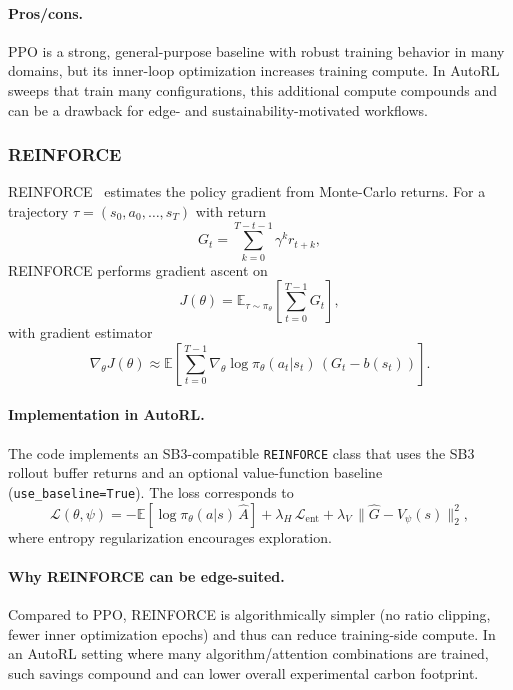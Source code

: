 \documentclass[11pt]{article}
\begin{document}
\paragraph{Pros/cons.}
PPO is a strong, general-purpose baseline with robust training behavior in many domains, but its inner-loop optimization increases training compute. In AutoRL sweeps that train many configurations, this additional compute compounds and can be a drawback for edge- and sustainability-motivated workflows.

\subsubsection{\textsc{REINFORCE}}
\textsc{REINFORCE}~\cite{Williams1992REINFORCE} estimates the policy gradient from Monte-Carlo returns. For a trajectory $\tau=(s_0,a_0,\dots,s_T)$ with return
\begin{equation}
  G_t = \sum_{k=0}^{T-t-1}\gamma^k r_{t+k},
\end{equation}
REINFORCE performs gradient ascent on
\begin{equation}
  J(\theta) = \mathbb{E}_{\tau\sim \pi_\theta}\left[\sum_{t=0}^{T-1} G_t\right],
\end{equation}
with gradient estimator
\begin{equation}
  \nabla_\theta J(\theta) \approx \mathbb{E}\left[\sum_{t=0}^{T-1} \nabla_\theta \log \pi_\theta(a_t|s_t)\, (G_t - b(s_t))\right].
\end{equation}

\paragraph{Implementation in AutoRL.}
The code implements an SB3-compatible \texttt{REINFORCE} class that uses the SB3 rollout buffer returns and an optional value-function baseline (\texttt{use\_baseline=True}). The loss corresponds to
\begin{equation}
  \mathcal{L}(\theta,\psi)= -\mathbb{E}[\log\pi_\theta(a|s)\,\hat{A}] + \lambda_H\,\mathcal{L}_{\text{ent}} + \lambda_V\,\lVert \hat{G} - V_\psi(s)\rVert_2^2,
\end{equation}
where entropy regularization encourages exploration.

\paragraph{Why \textsc{REINFORCE} can be edge-suited.}
Compared to PPO, REINFORCE is algorithmically simpler (no ratio clipping, fewer inner optimization epochs) and thus can reduce training-side compute. In an AutoRL setting where many algorithm/attention combinations are trained, such savings compound and can lower overall experimental carbon footprint.
\end{document}
